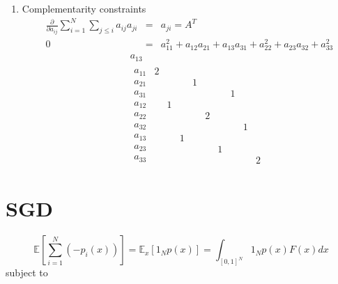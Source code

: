 \documentclass{article}
\begin{document}
\begin{enumerate}
\item Complementarity constraints%
\begin{eqnarray*}
\frac{\partial }{\partial a_{ij}}\sum_{i=1}^{N}\sum_{j\leq i}a_{ij}a_{ji}
&=&a_{ji}=A^{T} \\
0 &=&a_{11}^{2}+a_{12}a_{21}+a_{13}a_{31}+a_{22}^{2}+a_{23}a_{32}+a_{33}^{2}
\end{eqnarray*}%
\begin{eqnarray*}
&&a_{13} \\
&&%
\begin{array}{c}
a_{11} \\ 
a_{21} \\ 
a_{31} \\ 
a_{12} \\ 
a_{22} \\ 
a_{32} \\ 
a_{13} \\ 
a_{23} \\ 
a_{33}%
\end{array}%
\begin{array}{ccccccccc}
2 &  &  &  &  &  &  &  &  \\ 
&  &  & 1 &  &  &  &  &  \\ 
&  &  &  &  &  & 1 &  &  \\ 
& 1 &  &  &  &  &  &  &  \\ 
&  &  &  & 2 &  &  &  &  \\ 
&  &  &  &  &  &  & 1 &  \\ 
&  & 1 &  &  &  &  &  &  \\ 
&  &  &  &  & 1 &  &  &  \\ 
&  &  &  &  &  &  &  & 2%
\end{array}%
\end{eqnarray*}
\end{enumerate}

\section{SGD}

\[
\mathbb{E}\left[ \sum_{i=1}^{N}\left( -p_{i}\left( x\right) \right) \right] =%
\mathbb{E}_{x}\left[ 1_{N}p\left( x\right) \right] =\int_{\left[ 0,1\right]
^{N}}1_{N}p\left( x\right) F\left( x\right) dx 
\]%
subject to
\end{document}
